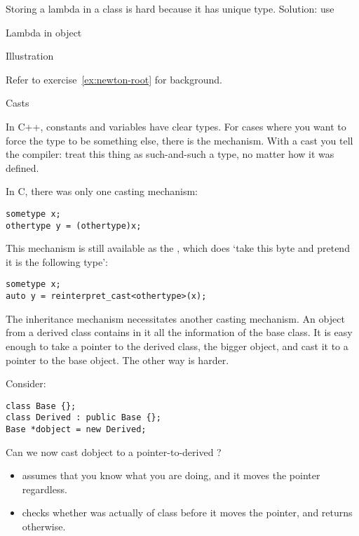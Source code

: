Storing a lambda in a class is hard because it has unique
type. Solution: use 

\begin{block}{Lambda in object}
  \label{sl:lambda-class}
\end{block}

\begin{block}{Illustration}
  \label{sl:lambda-classed}
\end{block}

\begin{exercise}
  \label{ex:newtonlambda}
  Refer to exercise~\ref{ex:newton-root} for background.

\end{exercise}

 {Casts}
\label{sec:cast}

In C++, constants and variables have clear types. For cases where you
want to force the type to be something else, there is the
 mechanism. With a cast you tell the compiler:
treat this thing as such-and-such a type, no matter how it was
defined.

In C, there was only one casting mechanism:
\begin{verbatim}
sometype x;
othertype y = (othertype)x;
\end{verbatim}
This mechanism is still available as the
, which does `take this byte and pretend
it is the following type':
\begin{verbatim}
sometype x;
auto y = reinterpret_cast<othertype>(x);
\end{verbatim}

The inheritance mechanism necessitates another casting mechanism.
An object from a derived class contains in it all the information of
the base class. It is easy enough to take a pointer to the derived
class, the bigger object, and cast it to a pointer to the base object.
The other way is harder.

Consider:
\begin{verbatim}
class Base {};
class Derived : public Base {};
Base *dobject = new Derived;
\end{verbatim}
Can we now cast dobject to a pointer-to-derived ?
\begin{itemize}
\item {} assumes that you know what you are
  doing, and it moves the pointer regardless.
\item {} checks whether  was
  actually of class  before it moves the pointer, and
  returns  otherwise.
\end{itemize}

